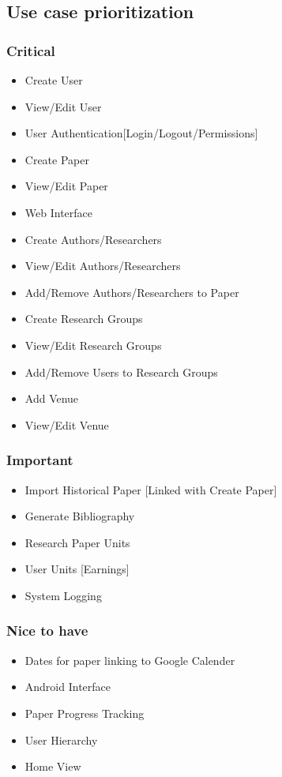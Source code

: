 \documentclass[a4paper,10pt]{article}
\begin{document}
\subsection{Use case prioritization}
\subsubsection{Critical}
	\begin{itemize}
	  	\item Create User
		\item View/Edit User
		\item User Authentication[Login/Logout/Permissions]
		\item Create Paper
		\item View/Edit Paper
		\item Web Interface
		\item Create Authors/Researchers
		\item View/Edit Authors/Researchers
		\item Add/Remove Authors/Researchers to Paper
		\item Create Research Groups
		\item View/Edit Research Groups
		\item Add/Remove Users to Research Groups
		\item Add Venue
		\item View/Edit Venue
	\end{itemize}

\subsubsection{Important}
	\begin{itemize}
	  	\item Import Historical Paper [Linked with Create Paper]
		\item Generate Bibliography
		\item Research Paper Units
		\item User Units [Earnings]
		\item System Logging 
	\end{itemize}


\subsubsection{Nice to have}
	\begin{itemize}
		\item Dates for paper linking to Google Calender
		\item Android Interface
		\item Paper Progress Tracking
		\item User Hierarchy
		\item Home View
	\end{itemize}
\end{document}
